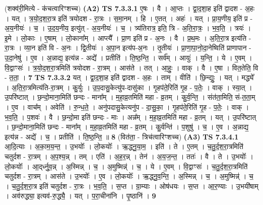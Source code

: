 \documentclass[17pt]{extarticle}
\begin{document}
                  \newline
                      (शक्व॑री॒मित्ये - क॑चत्वारिꣳशच्च)  \textbf{(A2)} \newline \newline
                                \textbf{ TS 7.3.3.1} \newline
                  ए॒षः । वै । आ॒प्तः । द्वा॒द॒शा॒ह इति॑ द्वादश - अ॒हः । यत् । त्र॒यो॒द॒श॒रा॒त्र इति॑ त्रयोदश - रा॒त्रः । स॒मा॒नम् । हि । ए॒तत् । अहः॑ । यत् । प्रा॒य॒णीय॒ इति॑ प्र - अ॒य॒नीयः॑ । च॒ । उ॒द॒य॒नीय॒ इत्यु॑त् - अ॒य॒नीयः॑ । च॒ । त्र्य॑तिरात्र॒ इति॒ त्रि - अ॒ति॒रा॒त्रः॒ । भ॒व॒ति॒ । त्रयः॑ । इ॒मे । लो॒काः । ए॒षाम् । लो॒काना᳚म् । आप्त्यै᳚ । प्रा॒ण इति॑ प्र - अ॒नः । वै । प्र॒थ॒मः । अ॒ति॒रा॒त्र इत्य॑ति - रा॒त्रः । व्या॒न इति॑ वि - अ॒नः । द्वि॒तीयः॑ । अ॒पा॒न इत्य॑प-अ॒नः । तृ॒तीयः॑ । प्रा॒णा॒पा॒नो॒दा॒नेष्विति॑ प्राणापान - उ॒दा॒नेषु॑ । ए॒व । अ॒न्नाद्य॒ इत्य॑न्न - अद्ये᳚ । प्रतीति॑ । ति॒ष्ठ॒न्ति॒ । सर्व᳚म् । आयुः॑ । य॒न्ति॒ । ये । ए॒वम् । वि॒द्वाꣳसः॑ । त्र॒यो॒द॒श॒रा॒त्रमिति॑ त्रयोदश - रा॒त्रम् । आस॑ते । तत् । आ॒हुः॒ । वाक् । वै । ए॒षा । वित॒तेति॒ वि - त॒ता॒ । \textbf{  7} \newline
                  \newline
                                \textbf{ TS 7.3.3.2} \newline
                  यत् । द्वा॒द॒शा॒ह इति॑ द्वादश - अ॒हः । ताम् । वीति॑ । छि॒न्द्युः॒ । यत् । मद्ध्ये᳚ । अ॒ति॒रा॒त्रमित्य॑ति-रा॒त्रम् । कु॒र्युः । उ॒प॒दासु॒केत्यु॑प-दासु॑का । गृ॒हप॑ते॒रिति॑ गृ॒ह - प॒तेः॒ । वाक् । स्या॒त् । उ॒परि॑ष्टात् । छ॒न्दो॒माना॒मिति॑ छन्दः - माना᳚म् । म॒हा॒व्र॒तमिति॑ महा - व्र॒तम् । कु॒र्व॒न्ति॒ । संत॑ता॒मिति॒ सं-त॒ता॒म् । ए॒व । वाच᳚म् । अवेति॑ । रु॒न्ध॒ते॒ । अनु॑पदासु॒केत्यनु॑प - दा॒सु॒का॒ । गृ॒हप॑ते॒रिति॑ गृ॒ह - प॒तेः॒ । वाक् । भ॒व॒ति॒ । प॒शवः॑ । वै । छ॒न्दो॒मा इति॑ छन्दः - माः । अन्न᳚म् । म॒हा॒व्र॒तमिति॑ महा - व्र॒तम् । यत् । उ॒परि॑ष्टात् । छ॒न्दो॒माना॒मिति॑ छन्दः - माना᳚म् । म॒हा॒व्र॒तमिति॑ महा - व्र॒तम् । कु॒र्वन्ति॑ । प॒शुषु॑ । च॒ । ए॒व । अ॒न्नाद्य॒ इत्य॑न्न - अद्ये᳚ । च॒ । प्रतीति॑ । ति॒ष्ठ॒न्ति॒ ॥ \textbf{  8 } \newline
                  \newline
                      (वित॑ता॒ - त्रिच॑त्वारिꣳशच्च)  \textbf{(A3)} \newline \newline
                                \textbf{ TS 7.3.4.1} \newline
                  आ॒दि॒त्याः । अ॒का॒म॒य॒न्त॒ । उ॒भयोः᳚ । लो॒कयोः᳚ । ऋ॒द्ध्नु॒या॒म॒ । इति॑ । ते । ए॒तम् । च॒तु॒र्द॒श॒रा॒त्रमिति॑ चतुर्दश - रा॒त्रम् । अ॒प॒श्य॒न्न् । तम् । एति॑ । अ॒ह॒र॒न्न् । तेन॑ । अ॒य॒ज॒न्त॒ । ततः॑ । वै । ते । उ॒भयोः᳚ । लो॒कयोः᳚ । आ॒द्‌र्ध्नु॒व॒न्न् । अ॒स्मिन्न् । च॒ । अ॒मुष्मिन्न्॑ । च॒ । ये । ए॒वम् । वि॒द्वाꣳसः॑ । च॒तु॒र्द॒श॒रा॒त्रमिति॑ चतुर्दश - रा॒त्रम् । आस॑ते । उ॒भयोः᳚ । ए॒व । लो॒कयोः᳚ । ऋ॒द्ध्नु॒व॒न्ति॒ । अ॒स्मिन्न् । च॒ । अ॒मुष्मिन्न्॑ । च॒ । च॒तु॒र्द॒श॒रा॒त्र इति॑ चतुर्दश - रा॒त्रः । भ॒व॒ति॒ । स॒प्त । ग्रा॒म्याः । ओष॑धयः । स॒प्त । आ॒र॒ण्याः । उ॒भयी॑षाम् । अव॑रुद्ध्या॒ इत्यव॑-रु॒द्ध्यै॒ । यत् । प॒रा॒चीना॑नि । पृ॒ष्ठानि॑ । \textbf{  9} \newline
\end{document}
